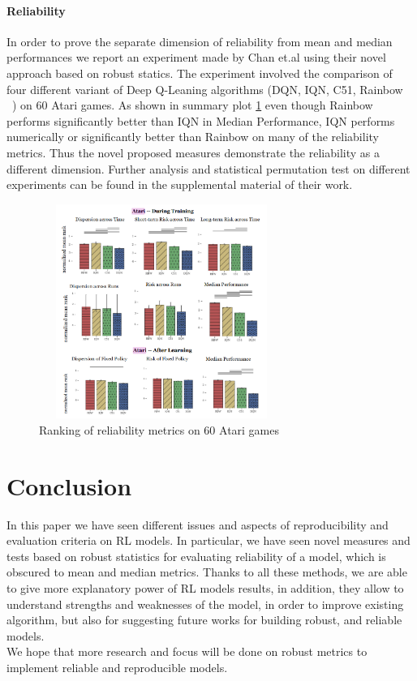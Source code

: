 \documentclass{article}
\begin{document}
\paragraph{Reliability}
In order to prove the separate dimension of reliability from mean and median performances we report an experiment made by Chan et.al using their novel approach based on robust statics. The experiment involved the comparison of four different variant of Deep Q-Leaning algorithms (DQN, IQN, C51, Rainbow ~\cite{DQN, IQN, C51,Rainbow}) on 60 Atari games. As shown in summary plot \ref{fig:realibility} even though Rainbow performs significantly better than IQN in Median Performance, IQN performs numerically or significantly better than Rainbow on many of the reliability metrics. Thus the novel proposed measures demonstrate the reliability as a different dimension. Further analysis and  statistical permutation test on different experiments can be found in the supplemental material of their work.

\begin{figure}[!htp]
	\centering
	\includegraphics[width=8cm, height=7cm]{./images/atari_ranking.png}
	\caption{Ranking of reliability metrics on 60 Atari games~\cite{GoogleMeasure}}
	\label{fig:realibility}
	\footnotesize{}
\end{figure}


\section{Conclusion}
In this paper we have seen different issues and aspects of reproducibility and evaluation criteria on RL models. In particular, we have seen novel measures and tests based on robust statistics for evaluating reliability of a model, which is obscured to mean and median metrics. Thanks to all these methods, we are able to give more explanatory power of RL models results, in addition, they allow to understand strengths and weaknesses of the model, in order to improve existing algorithm, but also for suggesting future works for building robust, and reliable models.\\
We hope that more research and focus will be done on robust metrics to implement reliable and reproducible models.

\clearpage

{\small
	
	
}

\appendix
\end{document}
